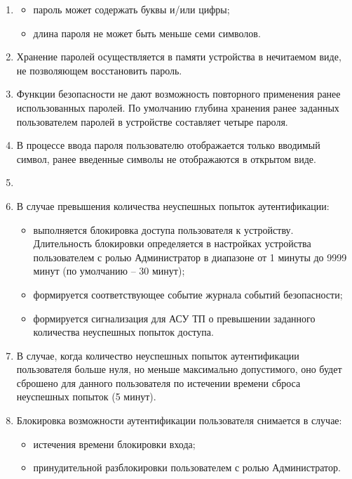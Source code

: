 \begin{enumerate}[label=\arabic{section}.\arabic{subsection}.\arabic*, labelsep=7pt, leftmargin=0pt, itemindent=60pt, align=left]
\begin{enumerate}
\item
{}
\begin{itemize}
    \item пароль может содержать буквы и/или цифры;
    \item длина пароля не может быть меньше семи символов. 
\end{itemize}

\item
Хранение паролей осуществляется в памяти устройства в нечитаемом виде, не позволяющем восстановить пароль.

\item
Функции безопасности не дают возможность повторного применения ранее использованных паролей.
По умолчанию глубина хранения ранее заданных пользователем паролей в устройстве составляет четыре пароля.

\item
В процессе ввода пароля пользователю отображается только вводимый символ, ранее введенные символы не отображаются в открытом виде.

\item
{}

\item
В случае превышения количества неуспешных попыток аутентификации:
\begin{itemize}
    \item выполняется блокировка доступа пользователя к устройству. Длительность блокировки определяется в настройках устройства пользователем с ролью Администратор в диапазоне от 1 минуты до 9999 минут (по умолчанию – 30 минут);
    \item формируется соответствующее событие журнала событий безопасности;
    \item формируется сигнализация для АСУ ТП о превышении заданного количества неуспешных попыток доступа. 
\end{itemize}

\item
В случае, когда количество неуспешных попыток аутентификации пользователя больше нуля, но меньше максимально допустимого, оно будет сброшено для данного пользователя по истечении времени сброса неуспешных попыток (5 минут).

\item
Блокировка возможности аутентификации пользователя снимается в случае:
\begin{itemize}
    \item истечения времени блокировки входа;
    \item принудительной разблокировки пользователем с ролью Администратор. 
\end{itemize}


\end{enumerate}
\end{enumerate}
